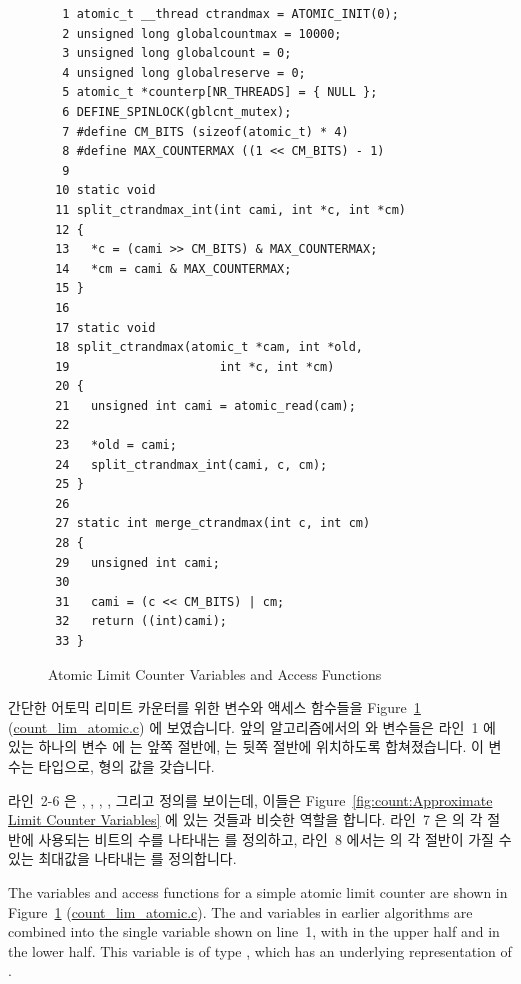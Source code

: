 \begin{figure}[tbp]
{ \scriptsize
\begin{verbatim}
  1 atomic_t __thread ctrandmax = ATOMIC_INIT(0);
  2 unsigned long globalcountmax = 10000;
  3 unsigned long globalcount = 0;
  4 unsigned long globalreserve = 0;
  5 atomic_t *counterp[NR_THREADS] = { NULL };
  6 DEFINE_SPINLOCK(gblcnt_mutex);
  7 #define CM_BITS (sizeof(atomic_t) * 4)
  8 #define MAX_COUNTERMAX ((1 << CM_BITS) - 1)
  9 
 10 static void
 11 split_ctrandmax_int(int cami, int *c, int *cm)
 12 {
 13   *c = (cami >> CM_BITS) & MAX_COUNTERMAX;
 14   *cm = cami & MAX_COUNTERMAX;
 15 }
 16 
 17 static void
 18 split_ctrandmax(atomic_t *cam, int *old,
 19                     int *c, int *cm)
 20 {
 21   unsigned int cami = atomic_read(cam);
 22 
 23   *old = cami;
 24   split_ctrandmax_int(cami, c, cm);
 25 }
 26 
 27 static int merge_ctrandmax(int c, int cm)
 28 {
 29   unsigned int cami;
 30 
 31   cami = (c << CM_BITS) | cm;
 32   return ((int)cami);
 33 }
\end{verbatim}
}
\caption{Atomic Limit Counter Variables and Access Functions}
\label{fig:count:Atomic Limit Counter Variables and Access Functions}
\end{figure}

간단한 어토믹 리미트 카운터를 위한 변수와 액세스 함수들을
Figure~\ref{fig:count:Atomic Limit Counter Variables and Access Functions}
(\url{count_lim_atomic.c}) 에 보였습니다.
앞의 알고리즘에서의  와  변수들은 라인~1 에 있는
하나의 변수  에  는 앞쪽 절반에,  는
뒷쪽 절반에 위치하도록 합쳐졌습니다.
이 변수는  타입으로,  형의 값을 갖습니다.

라인~2-6 은 , , ,
, 그리고  정의를 보이는데, 이들은
Figure~\ref{fig:count:Approximate Limit Counter Variables} 에 있는 것들과
비슷한 역할을 합니다.
라인~7 은  의 각 절반에 사용되는 비트의 수를 나타내는
를 정의하고, 라인~8 에서는  의 각 절반이 가질 수 있는
최대값을 나타내는  를 정의합니다.
\iffalse

The variables and access functions for a simple atomic limit counter
are shown in
Figure~\ref{fig:count:Atomic Limit Counter Variables and Access Functions}
(\url{count_lim_atomic.c}).
The  and  variables in earlier algorithms
are combined into the single variable  shown on
line~1, with  in the upper half and  in
the lower half.
This variable is of type , which has an underlying
representation of .

